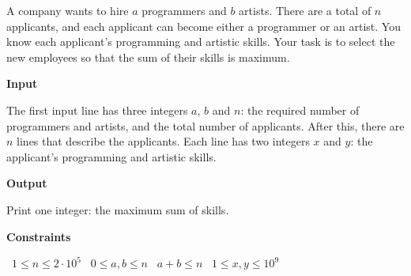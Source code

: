 A company wants to hire $a$ programmers and $b$ artists.
There are a total of $n$ applicants, and each applicant can become either a programmer or an artist. You know each applicant's programming and artistic skills.
Your task is to select the new employees so that the sum of their skills is maximum.

\vspace{0.3cm}\noindent\textbf{Input}

The first input line has three integers $a$, $b$ and $n$: the required number of programmers and artists, and the total number of applicants.
After this, there are $n$ lines that describe the applicants. Each line has two integers $x$ and $y$: the applicant's programming and artistic skills.

\vspace{0.3cm}\noindent\textbf{Output}

Print one integer: the maximum sum of skills.

\vspace{0.3cm}\noindent\textbf{Constraints}

\textbullet\ $1 \le n \le 2 \cdot 10^5$
\textbullet\ $0 \le a,b \le n$
\textbullet\ $a+b \le n$
\textbullet\ $1 \le x,y \le 10^9$